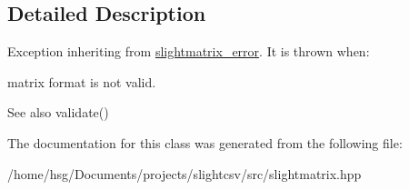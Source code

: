 \subsection{Detailed Description}
Exception inheriting from \hyperlink{classutils_1_1slightmatrix__error}{slightmatrix\+\_\+error}. It is thrown when\+:
\begin{DoxyItemize}
\item matrix format is not valid. \begin{DoxySeeAlso}{See also}
validate() 
\end{DoxySeeAlso}

\end{DoxyItemize}

The documentation for this class was generated from the following file\+:\begin{DoxyCompactItemize}
\item 
/home/hsg/\+Documents/projects/slightcsv/src/slightmatrix.\+hpp\end{DoxyCompactItemize}
